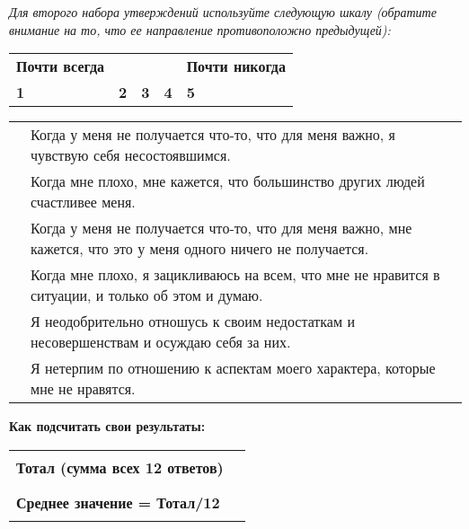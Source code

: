 \newpage

\textit{Для второго набора утверждений используйте следующую шкалу (обратите внимание на то, что ее направление противоположно предыдущей):}

\begin{flushright}
	\setlength{\extrarowheight}{2mm}
	\begin{tabularx}{11.5cm}{XXXXX}
		\textbf{Почти всегда} & & & & \textbf{Почти никогда} \\
		\textbf{1} & \textbf{2} & \textbf{3} & \textbf{4} & \textbf{5} \\
	\end{tabularx}
	\setlength{\extrarowheight}{0mm}
\end{flushright}

\begin{center}
	\setlength{\extrarowheight}{2mm}
	\begin{tabularx}{\textwidth}{p{1.7cm}X}
		\noindent\rule{1.7cm}{0.4pt} & Когда у меня не получается что-то, что для меня важно, я чувствую себя несостоявшимся. \\
		\noindent\rule{1.7cm}{0.4pt} & Когда мне плохо, мне кажется, что большинство других людей счастливее меня. \\
		\noindent\rule{1.7cm}{0.4pt} & Когда у меня не получается что-то, что для меня важно, мне кажется, что это у меня одного ничего не получается. \\
		\noindent\rule{1.7cm}{0.4pt} & Когда мне плохо, я зацикливаюсь на всем, что мне не нравится в ситуации, и только об этом и думаю. \\
		\noindent\rule{1.7cm}{0.4pt} & Я неодобрительно отношусь к своим недостаткам и несовершенствам и осуждаю себя за них. \\
		\noindent\rule{1.7cm}{0.4pt} & Я нетерпим по отношению к аспектам моего характера, которые мне не нравятся. \\
	\end{tabularx}
	\setlength{\extrarowheight}{0mm}	
\end{center}

\vspace{3ex}

\noindent\textbf{Как подсчитать свои результаты:}

\begin{flushright}
	\setlength{\extrarowheight}{5mm}
	\begin{tabularx}{11.5cm}{ll}
		\textbf{Тотал (сумма всех 12 ответов)} & \rule{1.7cm}{0.4pt} \\
		\textbf{Среднее значение = Тотал/12} & \rule{1.7cm}{0.4pt}
	\end{tabularx}
	\setlength{\extrarowheight}{0mm}
\end{flushright}

